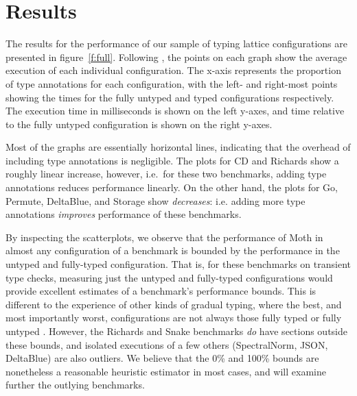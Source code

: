 \documentclass[sigplan,10pt,review,screen]{acmart}\settopmatter{printfolios=true}
\begin{document}
\section{Results}
\label{s-overall}

\begin{figure*}
	
	\caption{Graphs of (at most) 102 configurations in the typing lattices for each benchmark. Time is measured as the mean of the 351\textsuperscript{st} to the 1,000\textsuperscript{th} benchmark iteration under a single invocation of Moth (lower is better).}
	\label{f:full}
\end{figure*}
The results for the performance of our sample of typing lattice configurations are presented in figure~\ref{f:full}. Following \cite{vitousek-transient-arXive-2019}, the points on each graph show the average execution of each individual configuration. The x-axis represents the proportion of type annotations for each configuration, with the left- and right-most points showing the times for the fully untyped and typed configurations respectively. The execution time in milliseconds is shown on the left y-axes, and time relative to the fully untyped configuration is shown on the right y-axes.

Most of the graphs are essentially horizontal lines, indicating that the overhead of including type annotations is negligible. The plots for CD and Richards show a roughly linear increase, however, i.e.\ for these two benchmarks, adding type annotations reduces performance linearly. On the other hand, the plots for Go, Permute, DeltaBlue, and Storage show \emph{decreases}: i.e. adding more type annotations \emph{improves} performance of these benchmarks.

By inspecting the scatterplots, we observe that the performance of
Moth in almost any configuration of a benchmark is bounded by
the performance in the untyped and fully-typed configuration.
That is, for these benchmarks on transient type checks,
measuring just the untyped and fully-typed configurations
would provide excellent estimates of a benchmark's
performance bounds.  This is different to the experience
of other kinds of gradual typing, where the best, and most
importantly worst, configurations are not always those
fully typed or fully untyped \cite{Greenman2019jfp}.
%
However, the Richards and Snake benchmarks \textit{do} have
sections outside these bounds, and isolated executions of
a few others (SpectralNorm, JSON, DeltaBlue) are also outliers.
%
We believe that the 0\% and 100\% bounds are nonetheless a
reasonable heuristic estimator in most cases, and will
examine further the outlying benchmarks.
\end{document}
